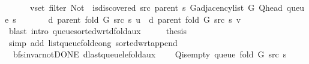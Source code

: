 \begin{isabellebody}
\ \ \ \ \ \ {\isasymforall}v{\isasymin}set\ {\isacharparenleft}{\kern0pt}filter\ {\isacharparenleft}{\kern0pt}Not\ {\isasymcirc}\ is{\isacharunderscore}{\kern0pt}discovered\ src\ {\isacharparenleft}{\kern0pt}parent\ s{\isacharparenright}{\kern0pt}{\isacharparenright}{\kern0pt}\ {\isacharparenleft}{\kern0pt}G{\isachardot}{\kern0pt}adjacency{\isacharunderscore}{\kern0pt}list\ G\ {\isacharparenleft}{\kern0pt}Q{\isacharunderscore}{\kern0pt}head\ {\isacharparenleft}{\kern0pt}queue\ s{\isacharparenright}{\kern0pt}{\isacharparenright}{\kern0pt}{\isacharparenright}{\kern0pt}{\isacharparenright}{\kern0pt}{\isachardot}{\kern0pt}\isanewline
\ \ \ \ \ \ \ d\ {\isacharparenleft}{\kern0pt}parent\ {\isacharparenleft}{\kern0pt}fold\ G\ src\ s{\isacharparenright}{\kern0pt}{\isacharparenright}{\kern0pt}\ u\ {\isasymle}\ d\ {\isacharparenleft}{\kern0pt}parent\ {\isacharparenleft}{\kern0pt}fold\ G\ src\ s{\isacharparenright}{\kern0pt}{\isacharparenright}{\kern0pt}\ v{\isachardoublequoteclose}\isanewline
\ \ \ \ \isamarkupfalse%
\ {\isacharparenleft}{\kern0pt}blast\ intro{\isacharcolon}{\kern0pt}\ queue{\isacharunderscore}{\kern0pt}sorted{\isacharunderscore}{\kern0pt}wrt{\isacharunderscore}{\kern0pt}d{\isacharunderscore}{\kern0pt}fold{\isacharunderscore}{\kern0pt}aux{\isacharparenright}{\kern0pt}\isanewline
\ \ \isamarkupfalse%
\ \isamarkupfalse%
\ {\isacharquery}{\kern0pt}thesis\ \isanewline
\ \ \ \ \isamarkupfalse%
\ {\isacharparenleft}{\kern0pt}simp\ add{\isacharcolon}{\kern0pt}\ list{\isacharunderscore}{\kern0pt}queue{\isacharunderscore}{\kern0pt}fold{\isacharunderscore}{\kern0pt}cong\ sorted{\isacharunderscore}{\kern0pt}wrt{\isacharunderscore}{\kern0pt}append{\isacharparenright}{\kern0pt}\isanewline
{}\isamarkupfalse%
%
\endisatagproof
{\isafoldproof}%
%
\isadelimproof
\isanewline
%
\endisadelimproof
%
\isadeliminvisible
\isanewline
%
\endisadeliminvisible
%
\isataginvisible
{}\isamarkupfalse%
\ {\isacharparenleft}{\kern0pt}\ bfs{\isacharunderscore}{\kern0pt}invar{\isacharunderscore}{\kern0pt}not{\isacharunderscore}{\kern0pt}DONE{\isacharparenright}{\kern0pt}\ d{\isacharunderscore}{\kern0pt}last{\isacharunderscore}{\kern0pt}queue{\isacharunderscore}{\kern0pt}le{\isacharunderscore}{\kern0pt}fold{\isacharunderscore}{\kern0pt}aux{\isacharcolon}{\kern0pt}\isanewline
\ \ \ {\isachardoublequoteopen}{\isasymnot}\ Q{\isacharunderscore}{\kern0pt}is{\isacharunderscore}{\kern0pt}empty\ {\isacharparenleft}{\kern0pt}queue\ {\isacharparenleft}{\kern0pt}fold\ G\ src\ s{\isacharparenright}{\kern0pt}{\isacharparenright}{\kern0pt}{\isachardoublequoteclose}\isanewline

\end{isabellebody}
